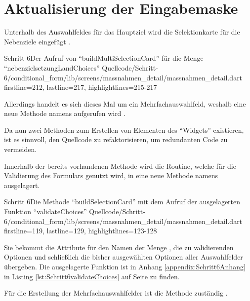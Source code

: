 \section{Aktualisierung der Eingabemaske}

Unterhalb des Auswahlfeldes für das Hauptziel wird die Selektionkarte für die Nebenziele eingefügt \Lst{\ref{lst:Schritt6buildMultiSelectionCardnebenzielsetzungLandChoices}}.
\begin{alexlisting}{Schritt 6}{Der Aufruf von \enquote{buildMultiSelectionCard} für die Menge \enquote{nebenzielsetzungLandChoices}}
  {Quellcode/Schritt-6/conditional_form/lib/screens/massnahmen_detail/massnahmen_detail.dart}
  {firstline=212, lastline=217, highlightlines={215-217}}
  \label{lst:Schritt6buildMultiSelectionCardnebenzielsetzungLandChoices}
\end{alexlisting}

Allerdings handelt es sich dieses Mal um ein Mehrfachauswahlfeld,
weshalb eine neue Methode namens  aufgerufen wird .

Da nun zwei Methoden zum Erstellen von Elementen des \enquote{Widgets}  existieren,
ist es sinnvoll,
den Quellcode zu refaktorisieren,
um redundanten Code zu vermeiden.



Innerhalb der bereits vorhandenen Methode  wird die Routine,
welche für die Validierung des Formulars genutzt wird,
in eine neue Methode namens   ausgelagert.
\begin{alexlisting}{Schritt 6}{Die Methode \enquote{buildSelectionCard} mit dem Aufruf der ausgelagerten Funktion \enquote{validateChoices}}
  {Quellcode/Schritt-6/conditional_form/lib/screens/massnahmen_detail/massnahmen_detail.dart}
  {firstline=119, lastline=129, highlightlines={123-128}}
  \label{lst:Schritt6buildSelectionCard}
\end{alexlisting}

Sie bekommt die Attribute für den Namen der Menge ,
die zu validierenden Optionen 
und schließlich die bisher ausgewählten Optionen aller Auswahlfelder  übergeben.
Die ausgelagerte Funktion ist in Anhang \ref{appendix:Schritt6Anhang} in Listing \ref{lst:Schritt6validateChoices} auf Seite \pageref{lst:Schritt6validateChoices} zu finden.


Für die Erstellung der Mehrfachauswahlfelder ist die Methode  zuständig \Lst{\ref{lst:Schritt6buildMultiSelectionCard}}.

